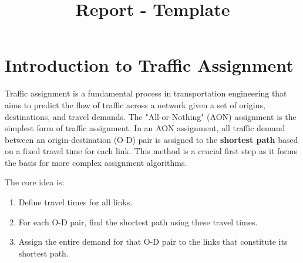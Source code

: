 \documentclass{rapportCS} %
\title{Report - Template}
\begin{document}







        
\fairemarges 
\fairepagedegarde 





\section{Introduction to Traffic Assignment}

Traffic assignment is a fundamental process in transportation engineering that aims to predict the flow of traffic across a network given a set of origins, destinations, and travel demands. The "All-or-Nothing" (AON) assignment is the simplest form of traffic assignment. In an AON assignment, all traffic demand between an origin-destination (O-D) pair is assigned to the \textbf{shortest path} based on a fixed travel time for each link. This method is a crucial first step as it forms the basis for more complex assignment algorithms.

The core idea is:
\begin{enumerate}
    \item Define travel times for all links.
    \item For each O-D pair, find the shortest path using these travel times.
    \item Assign the entire demand for that O-D pair to the links that constitute its shortest path.
\end{enumerate}
\end{document}
